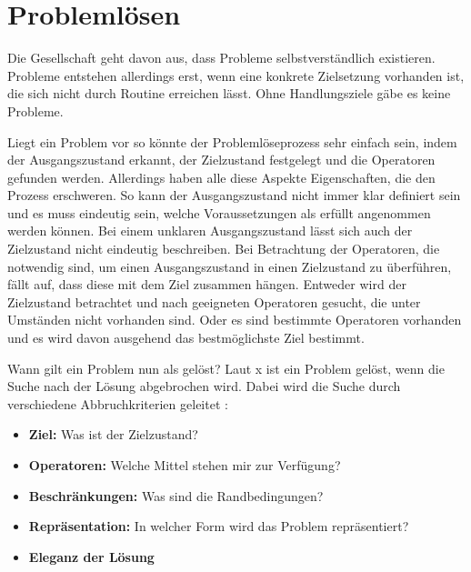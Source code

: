 \section{Problemlösen}
Die Gesellschaft geht davon aus, dass Probleme selbstverständlich existieren. Probleme entstehen allerdings erst, wenn eine konkrete Zielsetzung vorhanden ist, die sich nicht durch Routine erreichen lässt. Ohne Handlungsziele gäbe es keine Probleme. \cite{Funke2015, Betsch2011,  Dorner1984}

Liegt ein Problem vor so könnte der Problemlöseprozess sehr einfach sein, indem der Ausgangszustand erkannt, der Zielzustand festgelegt und die Operatoren gefunden werden. Allerdings haben alle diese Aspekte Eigenschaften, die den Prozess erschweren. So kann der Ausgangszustand nicht immer klar definiert sein und es muss eindeutig sein, welche Voraussetzungen als erfüllt angenommen werden können. Bei einem unklaren Ausgangszustand lässt sich auch der Zielzustand nicht eindeutig beschreiben. Bei Betrachtung der Operatoren, die notwendig sind, um einen Ausgangszustand in einen Zielzustand zu überführen, fällt auf, dass diese mit dem Ziel zusammen hängen. Entweder wird der Zielzustand betrachtet und nach geeigneten Operatoren gesucht, die unter Umständen nicht vorhanden sind. Oder es sind bestimmte Operatoren vorhanden und es wird davon ausgehend das bestmöglichste Ziel bestimmt. \cite{Funke2015}

Wann gilt ein Problem nun als gelöst? Laut x ist ein Problem gelöst, wenn die Suche nach der Lösung abgebrochen wird. Dabei wird die Suche durch verschiedene Abbruchkriterien geleitet \cite{Funke2015}:
\begin{itemize}
\item \textbf{Ziel:} Was ist der Zielzustand?
\item \textbf{Operatoren:} Welche Mittel stehen mir zur Verfügung?
\item \textbf{Beschränkungen:} Was sind die Randbedingungen?
\item \textbf{Repräsentation:} In welcher Form wird das Problem repräsentiert?
\item \textbf{Eleganz der Lösung} 
\end{itemize}

